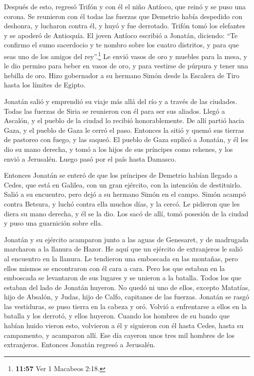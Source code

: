  Después de esto, regresó Trifón y con él el niño
Antíoco, que reinó y se puso una corona.  Se reunieron
con él todas las fuerzas que Demetrio había despedido con deshonra, y
lucharon contra él, y huyó y fue derrotado.  Trifón tomó
los elefantes y se apoderó de Antioquía.  El joven
Antíoco escribió a Jonatán, diciendo: ``Te confirmo el sumo sacerdocio y
te nombro sobre los cuatro distritos, y para que seas uno de los amigos
del rey''.\footnote{\textbf{11:57} Ver 1 Macabeos 2:18.} 
Le envió vasos de oro y muebles para la mesa, y le dio permiso para
beber en vasos de oro, y para vestirse de púrpura y tener una hebilla de
oro.  Hizo gobernador a su hermano Simón desde la
Escalera de Tiro hasta los límites de Egipto.

 Jonatán salió y emprendió su viaje más allá del río y a
través de las ciudades. Todas las fuerzas de Siria se reunieron con él
para ser sus aliados. Llegó a Ascalón, y el pueblo de la ciudad lo
recibió honorablemente.  De allí partió hacia Gaza, y el
pueblo de Gaza le cerró el paso. Entonces la sitió y quemó sus tierras
de pastoreo con fuego, y las saqueó.  El pueblo de Gaza
suplicó a Jonatán, y él les dio su mano derecha, y tomó a los hijos de
sus príncipes como rehenes, y los envió a Jerusalén. Luego pasó por el
país hasta Damasco.

 Entonces Jonatán se enteró de que los príncipes de
Demetrio habían llegado a Cedes, que está en Galilea, con un gran
ejército, con la intención de destituirlo.  Salió a su
encuentro, pero dejó a su hermano Simón en el campo. 
Simón acampó contra Betsura, y luchó contra ella muchos días, y la
cercó.  Le pidieron que les diera su mano derecha, y él
se la dio. Los sacó de allí, tomó posesión de la ciudad y puso una
guarnición sobre ella.

 Jonatán y su ejército acamparon junto a las aguas de
Genesaret, y de madrugada marcharon a la llanura de Hazor.
 He aquí que un ejército de extranjeros le salió al
encuentro en la llanura. Le tendieron una emboscada en las montañas,
pero ellos mismos se encontraron con él cara a cara. 
Pero los que estaban en la emboscada se levantaron de sus lugares y se
unieron a la batalla. Todos los que estaban del lado de Jonatán huyeron.
 No quedó ni uno de ellos, excepto Matatías, hijo de
Absalón, y Judas, hijo de Calfo, capitanes de las fuerzas.
 Jonatán se rasgó las vestiduras, se puso tierra en la
cabeza y oró.  Volvió a enfrentarse a ellos en la batalla
y los derrotó, y ellos huyeron.  Cuando los hombres de su
bando que habían huido vieron esto, volvieron a él y siguieron con él
hasta Cedes, hasta su campamento, y acamparon allí.  Ese
día cayeron unos tres mil hombres de los extranjeros. Entonces Jonatán
regresó a Jerusalén.

